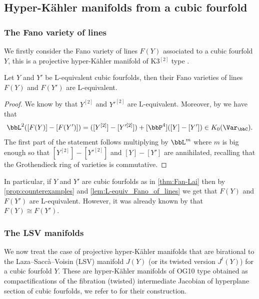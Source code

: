 \documentclass{amsart}
\begin{document}
\subsection{Hyper-Kähler manifolds from a cubic fourfold}

\subsubsection{The Fano variety of lines}
We firstly consider the Fano variety of lines \(F(Y)\) associated to a cubic fourfold \(Y\), this is a projective hyper-Kähler manifold of K3\(^{[2]}\) type \cite{beauville1985variete}.

\begin{proposition}\label{lem:L-equiv_Fano_of_lines}
    Let \(Y\) and \(Y'\) be L-equivalent cubic fourfolds, then their Fano varieties of lines \(F(Y)\) and \(F(Y')\) are L-equivalent.
\end{proposition}
\begin{proof}
   We know by \cite[Lemma 2.1]{okawa2021example} that \(Y^{[2]}\) and \(Y'^{[2]}\) are L-equivalent. Moreover, by \cite[Theorem 5.1]{galkin2014fano} we have that 
   \[\bbL^2([F(Y)]-[F(Y')])=([Y^{[2]}]-[Y'^{[2]}])+[\bbP^4]([Y]-[Y'])\in K_0(\Var_\bbC).\]
   The first part of the statement follows multiplying by \(\bbL^m\) where \(m\) is big enough so that \([Y^{[2]}]-[Y'^{[2]}]\) and \([Y]-[Y']\) are annihilated, recalling that the Grothendieck ring of varieties is commutative.
\end{proof}

In particular, if \(Y\) and \(Y'\) are cubic fourfolds as in \autoref{thm:Fan-Lai} then by \autoref{prop:counterexamples} and \autoref{lem:L-equiv_Fano_of_lines} we get that \(F(Y)\) and \(F(Y')\) are L-equivalent. However, it was already known by \cite[Theorem 4.1]{brooke2024cubic} that \(F(Y)\cong F(Y')\).






 \subsubsection{The LSV manifolds}\label{sec: LSV manifolds}
We now treat the case of projective hyper-Kähler manifolds that are birational to the Laza--Saccà--Voisin (LSV) manifold \(J(Y)\) (or its twisted version \(J^t(Y)\)) for a cubic fourfold \(Y\). These are hyper-Kähler manifolds of OG10 type obtained as compactifications of the fibration (twisted) intermediate Jacobian of hyperplane section of cubic fourfolds, we refer to \cite{laza2017hyper,voisin2016hyper} for their construction. 
\end{document}
